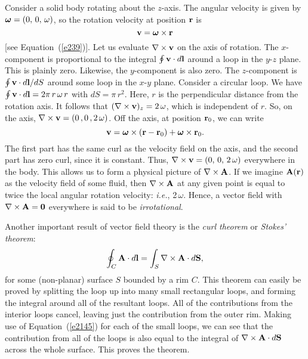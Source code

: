 Consider a solid body rotating about the $z$-axis. The angular velocity is given
by $\mbox{\boldmath$\omega$} = (0,\,0,\,\omega)$, so  the rotation velocity at
position ${\bf r}$ is
\begin{equation}
{\bf v} = \mbox{\boldmath$\omega$}\times {\bf r}
\end{equation}
[see Equation~(\ref{e239})].
Let us evaluate $\nabla\times{\bf v}$ on the axis of
rotation. The $x$-component is proportional to the
integral $\oint {\bf v}\cdot d{\bf l}$ around a loop in the $y$-$z$ plane. This is
plainly zero. Likewise, the $y$-component is also zero. The $z$-component
is $\oint {\bf v}\cdot d{\bf l}/ dS$ around some loop in the $x$-$y$ plane. 
Consider a circular loop. We have $\oint {\bf v}\cdot d{\bf l} = 2\pi \,r \,\omega \,r$ 
with $dS = \pi \,r^2$. 
Here, $r$ is the perpendicular distance from the rotation axis.
It follows that $(\nabla\times {\bf v})_z = 2\,\omega$, which
is independent of $r$. So, on the axis, $\nabla\times{\bf v} = (0\,,0\,,2\,\omega)$.
Off the axis, at position ${\bf r}_0$, we can write
\begin{equation}
{\bf v} = \mbox{\boldmath$\omega$}\times ({\bf r}-{\bf r}_0) + 
\mbox{\boldmath$\omega$}\times {\bf r}_0.
\end{equation}
The first part has the same curl as the velocity field on the axis, and the
second part has zero curl, since it is constant. Thus, 
$\nabla\times{\bf v} = (0,\,0,\,2\,\omega)$ everywhere in the body. This allows us to
form a physical picture of $\nabla\times{\bf A}$. If we imagine ${\bf A}({\bf r})$ as the
velocity field of some fluid, then $\nabla\times{\bf A}$ at any given point is equal
to twice the local angular rotation velocity: 
{\em i.e.},  2\,\mbox{\boldmath$\omega$}. 
Hence, a vector field with $\nabla\times{\bf A} ={\bf  0}$ everywhere is said to
be {\em irrotational}.


Another important  result of vector field theory is the {\em curl theorem}
or {\em Stokes' theorem}:
\begin{equation}
\oint_C {\bf A} \cdot d{\bf l} = \int_S \nabla\times{\bf A}\cdot d{\bf S},
\end{equation}
for some (non-planar) surface $S$ bounded by a rim $C$. This theorem can easily
be proved by splitting the loop up into many small rectangular loops, and forming
the integral around all of the resultant loops. All of the contributions from the
interior loops cancel, leaving just the contribution from the outer rim. 
Making use of Equation~(\ref{e2145}) for each of the small loops, we can see that the contribution
from all of the loops is also equal to the  integral of $\nabla\times{\bf A}
\cdot d{\bf S}$ across the whole surface. This proves the theorem.


